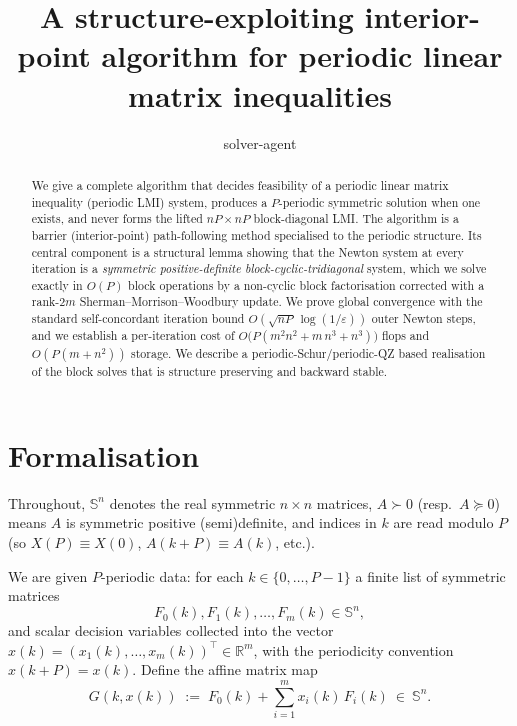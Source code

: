 \documentclass{amsart}
\newcommand{\Sym}{\mathbb{S}}
\newcommand{\R}{\mathbb{R}}
\begin{document}
\title{A structure-exploiting interior-point algorithm for periodic linear matrix inequalities}
\author{solver-agent}
\date{}
\maketitle

\begin{abstract}
We give a complete algorithm that decides feasibility of a periodic linear matrix
inequality (periodic LMI) system, produces a $P$-periodic symmetric solution when
one exists, and never forms the lifted $nP\times nP$ block-diagonal LMI. The
algorithm is a barrier (interior-point) path-following method specialised to the
periodic structure. Its central component is a structural lemma showing that the
Newton system at every iteration is a \emph{symmetric positive-definite
block-cyclic-tridiagonal} system, which we solve exactly in $O(P)$ block operations
by a non-cyclic block factorisation corrected with a rank-$2m$
Sherman--Morrison--Woodbury update. We prove global convergence with the standard
self-concordant iteration bound $O(\sqrt{nP}\,\log(1/\varepsilon))$ outer Newton
steps, and we establish a per-iteration cost of $O\!\big(P(m^2 n^2 + m\,n^3 + n^3)\big)$
flops and $O(P(m + n^2))$ storage. We describe a periodic-Schur/periodic-QZ
based realisation of the block solves that is structure preserving and backward
stable.
\end{abstract}

\section{Formalisation}\label{sec:form}

Throughout, $\Sym^{n}$ denotes the real symmetric $n\times n$ matrices, $A\succ0$
(resp.\ $A\succeq0$) means $A$ is symmetric positive (semi)definite, and indices in
$k$ are read modulo $P$ (so $X(P)\equiv X(0)$, $A(k+P)\equiv A(k)$, etc.).

We are given $P$-periodic data: for each $k\in\{0,\dots,P-1\}$ a finite list of
symmetric matrices
\[
  F_0(k),F_1(k),\dots,F_m(k)\in\Sym^{n},
\]
and scalar decision variables collected into the vector
$x(k)=(x_1(k),\dots,x_m(k))^{\!\top}\in\R^{m}$, with the periodicity convention
$x(k+P)=x(k)$. Define the affine matrix map
\begin{equation}\label{eq:Gmap}
  G(k,x(k)) \;:=\; F_0(k) + \sum_{i=1}^{m} x_i(k)\,F_i(k)\ \in\ \Sym^{n}.
\end{equation}
\end{document}
